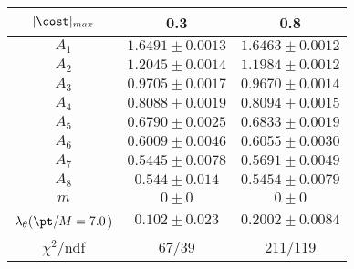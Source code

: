 \begin{tabular}{c|c|c}
$|\cost|_{max}$ & 0.3 & 0.8\\
\hline
$A_1$ & $1.6491\pm0.0013$ & $1.6463\pm0.0012$ \\
$A_2$ & $1.2045\pm0.0014$ & $1.1984\pm0.0012$ \\
$A_3$ & $0.9705\pm0.0017$ & $0.9670\pm0.0014$ \\
$A_4$ & $0.8088\pm0.0019$ & $0.8094\pm0.0015$ \\
$A_5$ & $0.6790\pm0.0025$ & $0.6833\pm0.0019$ \\
$A_6$ & $0.6009\pm0.0046$ & $0.6055\pm0.0030$ \\
$A_7$ & $0.5445\pm0.0078$ & $0.5691\pm0.0049$ \\
$A_8$ & $0.544\pm0.014$ & $0.5454\pm0.0079$ \\
$m$ & $0\pm0$ & $0\pm0$ \\
$\lambda_\theta(\pt/M = 7.0$) & $0.102\pm0.023$ & $0.2002\pm0.0084$ \\
\hline
$\chi^2$/ndf & 67/39 & 211/119
\end{tabular}
